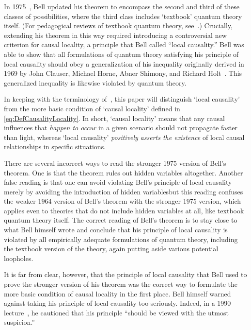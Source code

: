 \documentclass[12pt,english,prl,superscriptaddress,nobibnotes,nofootinbib]{revtex4-2}
\begin{document}
In 1975~\citep{Bell:1975ttolb}, Bell updated his theorem to encompass
the second and third of these classes of possibilities, where the
third class includes \textquoteleft textbook\textquoteright{} quantum
theory itself. (For pedagogical reviews of textbook quantum theory,
see~\citep{Sakurai:1993mqm,Shankar:1994pqm,GriffithsSchroeter:2018iqm}.)
Crucially, extending his theorem in this way required introducing
a controversial new criterion for causal locality, a principle that
Bell called ``local causality.'' Bell was able to show that all
formulations of quantum theory satisfying his principle of local causality
should obey a generalization of his inequality originally derived
in 1969 by John Clauser, Michael Horne, Abner Shimony, and Richard
Holt~\citep{ClauserHorneShimonyHolt:1969pettlhvt}. This generalized
inequality is likewise violated by quantum theory.

In keeping with the terminology of~\citep{MyrvoldGenoveseShimony:2024bst},
this paper will distinguish \textquoteleft local causality\textquoteright{}
from the more basic condition of \textquoteleft causal locality\textquoteright{}
defined in \eqref{eq:DefCausalityLocality}. In short, \textquoteleft causal
locality\textquoteright{} means that any causal influences that \emph{happen
to occur} in a given scenario should not propagate faster than light,
whereas \textquoteleft local causality\textquoteright{} \emph{positively}
\emph{asserts the existence} of local causal relationships in specific
situations.

There are several incorrect ways to read the stronger 1975 version
of Bell's theorem. One is that the theorem rules out hidden variables
altogether. Another false reading is that one can avoid violating
Bell's principle of local causality merely by avoiding the introduction
of hidden variables\textemdash but this reading confuses the weaker
1964 version of Bell's theorem with the stronger 1975 version, which
applies even to theories that do not include hidden variables at all,
like textbook quantum theory itself. The correct reading of Bell's
theorem is to stay close to what Bell himself wrote and conclude that
his principle of local causality is violated by all empirically adequate
formulations of quantum theory, including the textbook version of
the theory, again putting aside various potential loopholes.

It is far from clear, however, that the principle of local causality
that Bell used to prove the stronger version of his theorem was the
correct way to formulate the more basic condition of causal locality
in the first place. Bell himself warned against taking his principle
of local causality too seriously. Indeed, in a 1990 lecture~\citep{Bell:1990lnc},
he cautioned that his principle ``should be viewed with the utmost
suspicion.''
\end{document}
